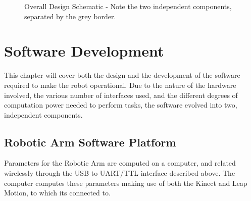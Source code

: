 \documentclass[12p,a4paper]{report}
\begin{document}
\begin{figure}[H]
\begin{center}
\caption{Overall Design Schematic - Note the two independent components, separated by the grey border.}
\label{fig:overall_schematic}
\end{center}
\end{figure}


\chapter{Software Development}
This chapter will cover both the design and the development of the software required to make the robot operational. Due to the nature of the hardware involved, the various number of interfaces used, and the different degrees of computation power needed to perform tasks, the software evolved into two, independent components. 


\section{Robotic Arm Software Platform}

Parameters for the Robotic Arm are computed on a computer, and related wirelessly through the USB to UART/TTL interface described above. The computer computes these parameters making use of both the Kinect and Leap Motion, to which its connected to.
\end{document}
